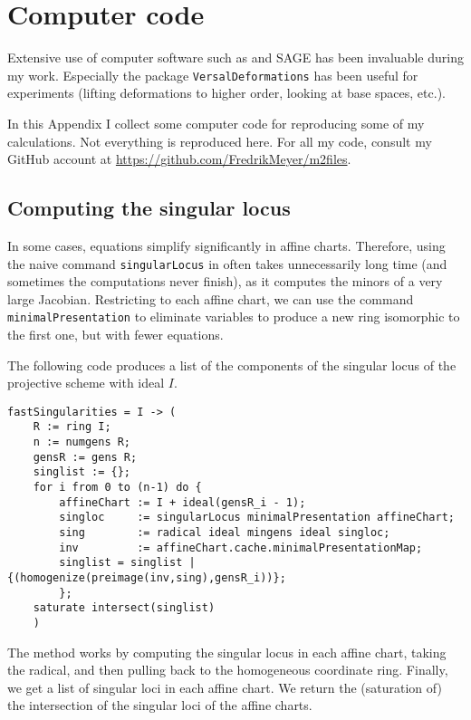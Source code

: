 \chapter{Computer code}
\label{sec:computercode}

Extensive use of computer software such as \MM \cite{M2} and SAGE \cite{sagemath} has been invaluable during my work. Especially the \MM package \texttt{VersalDeformations} \cite{ilten_versaldeformations} has been useful for experiments (lifting deformations to higher order, looking at base spaces, etc.).

In this Appendix I collect some computer code for reproducing some of my calculations. Not everything is reproduced here. For all my code, consult my GitHub account at \url{https://github.com/FredrikMeyer/m2files}.

\section{Computing the singular locus}

In some cases, equations simplify significantly in affine charts. Therefore, using the naive command \texttt{singularLocus} in \MM often takes unnecessarily long time (and sometimes the computations never finish), as it computes the minors of a very large Jacobian. Restricting to each affine chart, we can use the command \texttt{minimalPresentation} to eliminate variables to produce a new ring isomorphic to the first one, but with fewer equations.

The following code produces a list of the components of the singular locus of the projective scheme with ideal $I$.

\begin{lstlisting}[language=Macaulay2]
fastSingularities = I -> (
    R := ring I;
    n := numgens R;
    gensR := gens R;
    singlist := {};
    for i from 0 to (n-1) do {
        affineChart := I + ideal(gensR_i - 1);
        singloc     := singularLocus minimalPresentation affineChart;
        sing        := radical ideal mingens ideal singloc;
        inv         := affineChart.cache.minimalPresentationMap;
        singlist = singlist | {(homogenize(preimage(inv,sing),gensR_i))};
        };
    saturate intersect(singlist)
    )
\end{lstlisting}

The method works by computing the singular locus in each affine chart, taking the radical, and then pulling back to the homogeneous coordinate ring. Finally, we get a list of singular loci in each affine chart. We return the (saturation of) the intersection of the singular loci of the affine charts.

